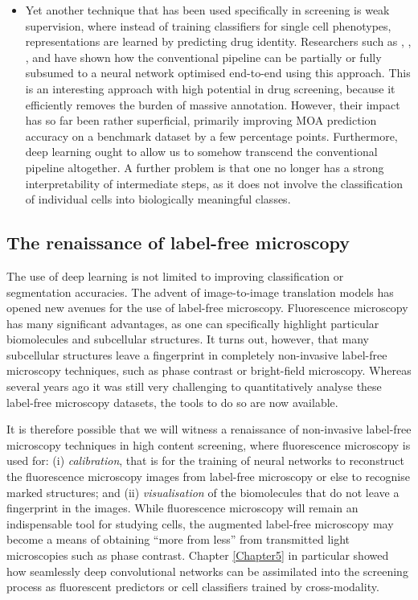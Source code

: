 \begin{itemize}
	\item Yet another technique that has been used specifically in screening is weak supervision, where instead of training classifiers for single cell phenotypes, representations are learned by predicting drug identity. Researchers such as \cite{kraus2016classifying}, \cite{kandaswamy2016high}, \cite{godinez2017multi}, and \cite{sommer2017deep} have shown how the conventional pipeline can be partially or fully subsumed to a neural network optimised end-to-end using this approach. This is an interesting approach with high potential in drug screening, because it efficiently removes the burden of massive annotation. However, their impact has so far been rather superficial, primarily improving MOA prediction accuracy on a benchmark dataset by a few percentage points. Furthermore, deep learning ought to allow us to somehow transcend the conventional pipeline altogether. A further problem is that one no longer has a strong interpretability of intermediate steps, as it does not involve the classification of individual cells into biologically meaningful classes.
\end{itemize}

\subsection{The renaissance of label-free microscopy}

The use of deep learning is not limited to improving classification or segmentation accuracies. The advent of image-to-image translation models has opened new avenues for the use of label-free microscopy. Fluorescence microscopy has many significant advantages, as one can specifically highlight particular biomolecules and subcellular structures. It turns out, however, that many subcellular structures leave a fingerprint in completely non-invasive label-free microscopy techniques, such as phase contrast or bright-field microscopy. Whereas several years ago it was still very challenging to quantitatively analyse these label-free microscopy datasets, the tools to do so are now available.

It is therefore possible that we will witness a renaissance of non-invasive label-free microscopy techniques in high content screening, where fluorescence microscopy is used for: (i) \emph{calibration}, that is for the training of neural networks to reconstruct the fluorescence microscopy images from label-free microscopy or else to recognise marked structures; and (ii) \emph{visualisation} of the biomolecules that do not leave a fingerprint in the images. While fluorescence microscopy will remain an indispensable tool for studying cells, the augmented label-free microscopy may become a means of obtaining ``more from less'' from transmitted light microscopies such as phase contrast. Chapter \ref{Chapter5} in particular showed how seamlessly deep convolutional networks can be assimilated into the screening process as fluorescent predictors or cell classifiers trained by cross-modality.

